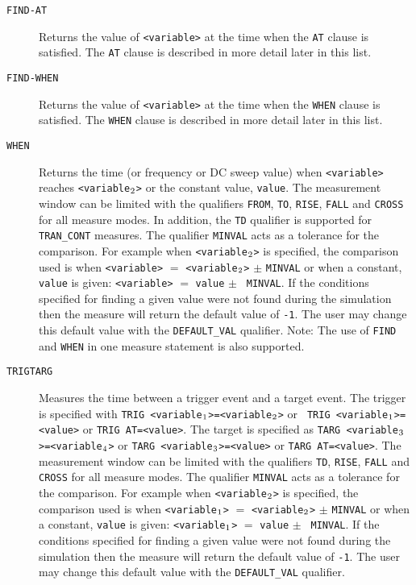 \begin{Command}
\begin{Arguments}
\begin{description}
   \item[\tt FIND-AT] Returns the value of {\tt <variable>} at the
    time when the {\tt AT} clause is satisfied.  The {\tt AT}
    clause is described in more detail later in this list.

  \item[\tt FIND-WHEN] Returns the value of {\tt <variable>} at the
    time when the {\tt WHEN} clause is satisfied.  The {\tt WHEN}
    clause is described in more detail later in this list.

  \item[\tt WHEN] Returns the time (or frequency or DC sweep value) when
    {\tt <variable>} reaches {\tt <variable\(\sb{2}\)>} or the constant
    value, {\tt value}.  The measurement window can be limited with the
    qualifiers {\tt FROM}, {\tt TO}, {\tt RISE}, {\tt FALL} and {\tt CROSS}
    for all measure modes.  In addition, the {\tt TD} qualifier is supported
    for {\tt TRAN\_CONT} measures. The qualifier {\tt MINVAL} acts as a
    tolerance for the comparison.  For example when {\tt <variable\(\sb{2}\)>}
    is specified, the comparison used is when {\tt <variable>} $=$
    {\tt <variable\(\sb{2}\)>} $\pm$ {\tt MINVAL} or when a constant,
    {\tt value} is given: {\tt <variable>} $=$ {\tt value} $\pm$ {\tt
    MINVAL}.  If the conditions specified for finding a given value
    were not found during the simulation then the measure will return
    the default value of {\tt -1}.  The user may change this default
    value with the {\tt DEFAULT\_VAL} qualifier.  Note: The use of
    {\tt FIND} and {\tt WHEN} in one measure statement is also supported.

  \item[\vbox{\hbox{\tt TRIG\hfil}\hbox{\tt TARG\hfil}}] Measures the
    time between a trigger event and a target event.  The trigger is
    specified with {\tt TRIG <variable\(\sb{1}\)>=<variable\(\sb{2}\)>} or {\tt
    TRIG <variable\(\sb{1}\)>=<value>} or {\tt TRIG AT=<value>}.  The target
     is specified as {\tt TARG <variable\(\sb{3}\)>=<variable\(\sb{4}\)>}
    or {\tt TARG <variable\(\sb{3}\)>=<value>} or {\tt TARG AT=<value>}.  The
    measurement window can be limited with the qualifiers {\tt TD}, {\tt RISE},
    {\tt FALL} and {\tt CROSS} for all measure modes.  The qualifier {\tt MINVAL}
     acts as a tolerance for the comparison.  For example when {\tt <variable\(\sb{2}\)>}
    is specified, the comparison used is when {\tt <variable\(\sb{1}\)>} $=$
    {\tt <variable\(\sb{2}\)>} $\pm$ {\tt MINVAL} or when a constant,
    {\tt value} is given: {\tt <variable\(\sb{1}\)>} $=$ {\tt value} $\pm$ {\tt
    MINVAL}.  If the conditions specified for finding a given value
    were not found during the simulation then the measure will return
    the default value of {\tt -1}.  The user may change this default
    value with the {\tt DEFAULT\_VAL} qualifier.  
\end{description}


\end{Arguments}
\end{Command}
